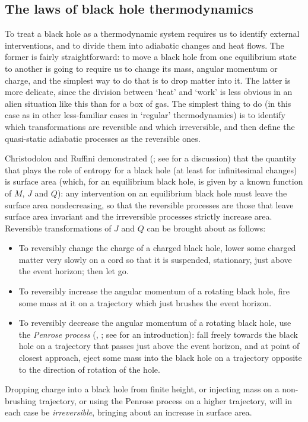 \documentclass[12pt]{article}
\begin{document}
\subsection{The laws of black hole thermodynamics}

To treat a black hole as a thermodynamic system requires us to identify external interventions, and to divide them into adiabatic changes and heat flows. The former is fairly straightforward: to move a black hole from one equilibrium state to another is going to require us to change its mass, angular momentum or charge, and the simplest way to do that is to drop matter into it. The latter is more delicate, since the division between `heat' and `work' is less obvious in an alien situation like this than for a box of gas. The simplest thing to do (in this case as in other less-familiar cases in `regular' thermodynamics) is to identify which transformations are reversible and which irreversible, and then define the quasi-static adiabatic processes as the reversible ones.

Christodolou and Ruffini demonstrated (; see  for a discussion) that the quantity that plays the role of entropy for a black hole (at least for infinitesimal changes) is surface area (which, for an equilibrium black hole, is given by a known function of $M$, $J$ and $Q$): any intervention on an equilibrium black hole must leave the surface area nondecreasing, so that the reversible processes are those that leave surface area invariant and the irreversible processes strictly increase area. Reversible transformations of $J$ and $Q$ can be brought about as follows:
\begin{itemize}
\item To reversibly change the charge of a charged black hole, lower some charged matter very slowly on a cord so that it is suspended, stationary, just above the event horizon; then let go. 
\item To reversibly increase the angular momentum of a rotating black hole, fire some mass at it on a trajectory which just brushes the event horizon.
\item To reversibly decrease the angular momentum of a rotating black hole, use the \emph{Penrose process} (, ; see  for an introduction): fall freely towards the black hole on a trajectory that passes just above the event horizon, and at point of closest approach, eject some mass into the black hole on a trajectory opposite to the direction of rotation of the hole.
\end{itemize}
Dropping charge into a black hole from finite height, or injecting mass on a non-brushing trajectory, or using the Penrose process on a higher trajectory, will in each case be \emph{irreversible}, bringing about an increase in surface area.
\end{document}
